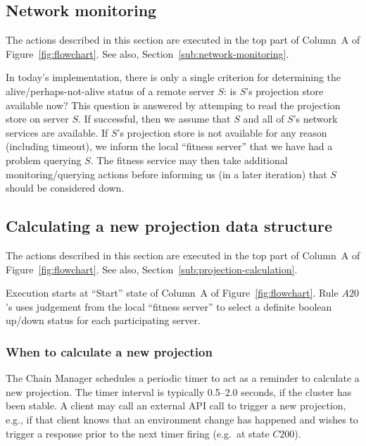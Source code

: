 \documentclass[preprint,10pt]{sigplanconf}
\begin{document}
\subsection{Network monitoring}
\label{sub:humming-network-monitoring}

The actions described in this section are executed in the top part of
Column~A of Figure~\ref{fig:flowchart}.
See also, Section~\ref{sub:network-monitoring}.

In today's implementation, there is only a single criterion for
determining the alive/perhaps-not-alive status of a remote server $S$:
is $S$'s projection store available now?  This question is answered by
attemping to read the projection store on server $S$.  
If successful, then we assume that $S$ and all of $S$'s network services
are available.  If $S$'s projection store is not available for any
reason (including timeout), we inform the local ``fitness server''
that we have had a problem querying $S$.  The fitness service may then
take additional monitoring/querying actions before informing us (in a
later iteration) that $S$ should be considered down.


\subsection{Calculating a new projection data structure}
\label{sub:humming-projection-calculation}

The actions described in this section are executed in the top part of
Column~A of Figure~\ref{fig:flowchart}.
See also, Section~\ref{sub:projection-calculation}.

Execution starts at ``Start'' state of Column~A of
Figure~\ref{fig:flowchart}.  Rule $A20$'s uses judgement from the
local ``fitness server'' to select a definite
boolean up/down status for each participating server.

\subsubsection{When to calculate a new projection}
\label{ssub:when-to-calc}

The Chain Manager schedules a periodic timer to act as a reminder to
calculate a new projection.  The timer interval is typically
0.5--2.0 seconds, if the cluster has been stable.  A client may call an
external API call to trigger a new projection, e.g., if that client
knows that an environment change has happened and wishes to trigger a
response prior to the next timer firing (e.g.~at state $C200$).
\end{document}
